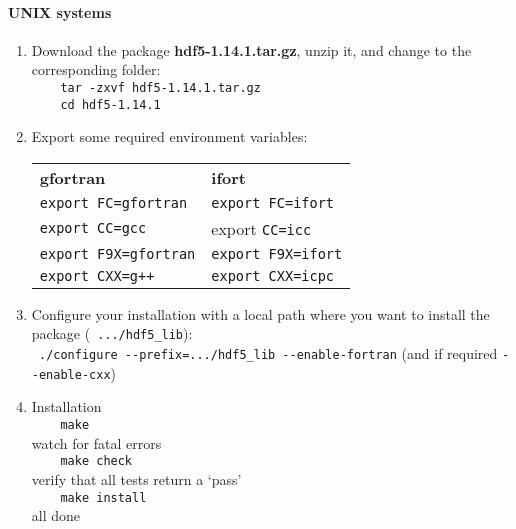 \documentclass[10pt,a4paper]{article}
\begin{document}
\paragraph{UNIX systems}
\begin{enumerate}
\item Download the package \textbf{hdf5-1.14.1.tar.gz}, unzip it, and change to the corresponding folder: \\
  \verb|    tar -zxvf hdf5-1.14.1.tar.gz|\\
  \verb|    cd hdf5-1.14.1|
\item Export some required environment variables:\\
    \begin{tabular}{ll}
      \textbf{gfortran}  & \textbf{ifort} \\
      \verb|export FC=gfortran| & \verb|export FC=ifort| \\
      \verb|export CC=gcc| & export \verb|CC=icc| \\
      \verb|export F9X=gfortran| & \verb|export F9X=ifort| \\
      \verb|export CXX=g++| & \verb|export CXX=icpc|
    \end{tabular}
\item Configure your installation with a local path where you want to install the package (\eg~\verb|.../hdf5_lib|):\\
  \verb| ./configure --prefix=.../hdf5_lib --enable-fortran| (and if required \verb|--enable-cxx|)
\item Installation \\
  \verb|    make|\\ 
   watch for fatal errors\\
  \verb|    make check|\\
  verify that all tests return a `pass' \\
  \verb|    make install|\\
   all done
\end{enumerate}
\end{document}
